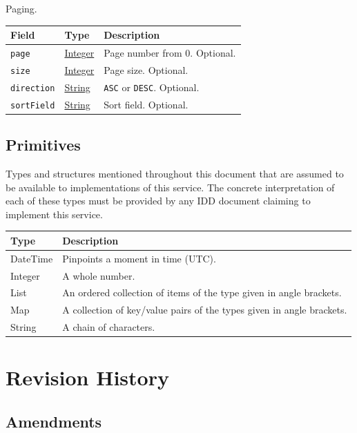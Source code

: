 \documentclass[a4paper]{arrowhead}
\newcommand{\pdef}[1]{{\textcolor{ArrowheadGrey}{#1\label{sec:model:primitives:#1}\label{sec:model:primitives:#1s}\label{sec:model:primitives:#1es}}}}
\newcommand{\pref}[1]{{\textcolor{ArrowheadGrey}{\hyperref[sec:model:primitives:#1]{#1}}}}
\begin{document}
Paging.

{\small
\begin{longtable}{|p{3.9cm}|p{4.4cm}|p{7.5cm}|}

\hline
\rowcolor{gray!33} Field & Type & Description \\ \hline
\endhead
\texttt{page} & \pref{Integer} & Page number from 0. Optional. \\ \hline
\texttt{size} & \pref{Integer} & Page size. Optional. \\ \hline
\texttt{direction} & \pref{String} & \texttt{ASC} or \texttt{DESC}. Optional. \\ \hline
\texttt{sortField} & \pref{String} & Sort field. Optional. \\ \hline
\end{longtable}
}


\subsection{Primitives}
\label{sec:model:primitives}
Types and structures mentioned throughout this document that are assumed to be available to implementations of this
service. The concrete interpretation of each of these types must be provided by any IDD document claiming to implement
this service.

{\small
\begin{longtable}{|p{3.2cm}|p{12.6cm}|}

\hline
\rowcolor{gray!33} Type & Description \\ \hline
\endhead
\pdef{DateTime} & Pinpoints a moment in time (UTC). \\ \hline
\pdef{Integer} & A whole number. \\ \hline
\pdef{List} & An ordered collection of items of the type given in angle brackets. \\ \hline
\pdef{Map} & A collection of key/value pairs of the types given in angle brackets. \\ \hline
\pdef{String} & A chain of characters. \\ \hline
\end{longtable}
}


\newpage



\newpage

\section{Revision History}
\subsection{Amendments}
\end{document}
